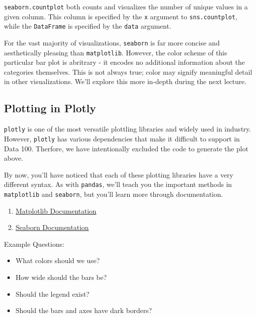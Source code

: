 \documentclass[
  letterpaper,
  DIV=11,
  numbers=noendperiod]{scrreprt}
\providecommand{\tightlist}{%
  \setlength{\itemsep}{0pt}\setlength{\parskip}{0pt}}\usepackage{longtable,booktabs,array}
\begin{document}
\texttt{seaborn.countplot} both counts and visualizes the number of
unique values in a given column. This column is specified by the
\texttt{x} argument to \texttt{sns.countplot}, while the
\texttt{DataFrame} is specified by the \texttt{data} argument.

For the vast majority of visualizations, \texttt{seaborn} is far more
concise and aesthetically pleasing than \texttt{matplotlib}. However,
the color scheme of this particular bar plot is abritrary - it encodes
no additional information about the categories themselves. This is not
always true; color may signify meaningful detail in other
visualizations. We'll explore this more in-depth during the next
lecture.

\hypertarget{plotting-in-plotly}{%
\subsection{Plotting in Plotly}\label{plotting-in-plotly}}

\texttt{plotly} is one of the most versatile plottling libraries and
widely used in industry. However, \texttt{plotly} has various
dependencies that make it difficult to support in Data 100. Therfore, we
have intentionally excluded the code to generate the plot above.

By now, you'll have noticed that each of these plotting libraries have a
very different syntax. As with \texttt{pandas}, we'll teach you the
important methods in \texttt{matplotlib} and \texttt{seaborn}, but
you'll learn more through documentation.

\begin{enumerate}
\def\labelenumi{\arabic{enumi}.}
\tightlist
\item
  \href{https://matplotlib.org/stable/index.html}{Matplotlib
  Documentation}
\item
  \href{https://seaborn.pydata.org/}{Seaborn Documentation}
\end{enumerate}

Example Questions:

\begin{itemize}
\tightlist
\item
  What colors should we use?
\item
  How wide should the bars be?
\item
  Should the legend exist?
\item
  Should the bars and axes have dark borders?
\end{itemize}
\end{document}
